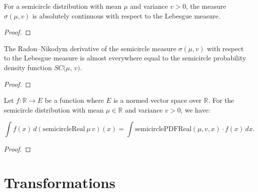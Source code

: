 \begin{lemma}
  \label{lem:semicircleReal_absolutelyContinuous}
  \leanok
  For a semicircle distribution with mean $\mu$ and variance $v > 0$, the measure $\sigma(\mu, v)$ is absolutely continuous with respect to the Lebesgue measure.
\end{lemma}

\begin{proof}
\leanok
\end{proof}

\begin{lemma}
  \label{lem:rnDeriv_semicircleReal}
  \leanok
  The Radon–Nikodym derivative of the semicircle measure $\sigma(\mu, v)$ with respect to the Lebesgue measure is almost everywhere equal to the semicircle probability density function $SC(\mu$, $v)$.
\end{lemma}

\begin{proof}
\leanok
\end{proof}

\begin{lemma}
  \label{lem:integral_semicircleReal_eq_integral_smul}
  \leanok

  Let $ f : \mathbb{R} \to E $ be a function where $ E $ is a normed vector space over $\mathbb{R}$. For the semicircle distribution with mean $\mu \in \mathbb{R}$ and variance $ v > 0 $, we have:

  \[
  \int f(x) \, d(\mathrm{semicircleReal}\ \mu\, v)(x) = \int \mathrm{semicirclePDFReal}(\mu, v, x) \cdot f(x) \, dx.
  \]


\end{lemma}

\begin{proof}
\leanok
\end{proof}



\section{Transformations}

